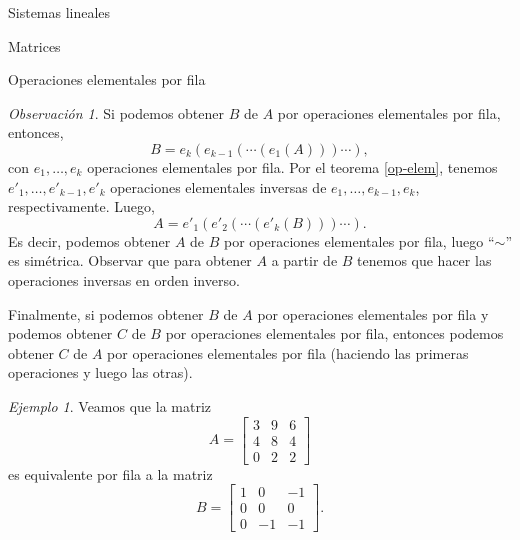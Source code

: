 \documentclass[a4paper,12pt,twoside,spanish,reqno]{amsbook}
\numberwithin{equation}{section}
\theoremstyle{definition}
\theoremstyle{remark}
\newtheorem*{ejemplo*}{Ejemplo}
\newtheorem*{obs*}{Observaci\'on}
\begin{document}
\begin{chapter}{Sistemas lineales}
\begin{section}{Matrices}
\begin{subsection}{Operaciones elementales por fila}
\begin{obs*}
                    Si podemos obtener $B$ de $A$ por operaciones elementales por fila, entonces, 
                    $$
                    B = e_k(e_{k-1}(\cdots(e_1(A)))\cdots),
                    $$
                    con $e_1,\ldots,e_k$ operaciones elementales por fila. Por el teorema \ref{op-elem},  tenemos $e'_1,\ldots,e'_{k-1},e'_k$ operaciones elementales inversas de  $e_1,\ldots,e_{k-1},e_k$, respectivamente. Luego, 
                    $$
                    A = e'_1(e'_{2}(\cdots(e'_k(B)))\cdots).
                    $$
                    Es decir, podemos  obtener $A$ de $B$ por operaciones elementales por fila, luego ``$\sim$'' es simétrica. Observar que para obtener $A$ a partir de $B$ tenemos que hacer las operaciones inversas en orden inverso. 
                    
                    Finalmente,   si podemos obtener $B$ de $A$ por operaciones elementales por fila y  podemos obtener $C$ de $B$ por operaciones elementales por fila, entonces podemos obtener $C$ de $A$ por operaciones elementales por fila (haciendo las primeras operaciones y luego las otras).
                \end{obs*}
                
                \begin{ejemplo*}
                    Veamos que la matriz 
                    \begin{equation*}
                    A= 	\begin{bmatrix}
                    3 & 9 & 6 \\ 4&8&4 \\ 0&2&2
                    \end{bmatrix}
                    \end{equation*}
                    es equivalente por fila a la matriz
                    \begin{equation*}
                    B = \begin{bmatrix}
                    1&0&-1 \\ 0&0&0\\  0&-1&-1
                    \end{bmatrix}.
                    \end{equation*}
                        \end{ejemplo*}
                    

\end{subsection}
\end{section}
\end{chapter}
\end{document}
